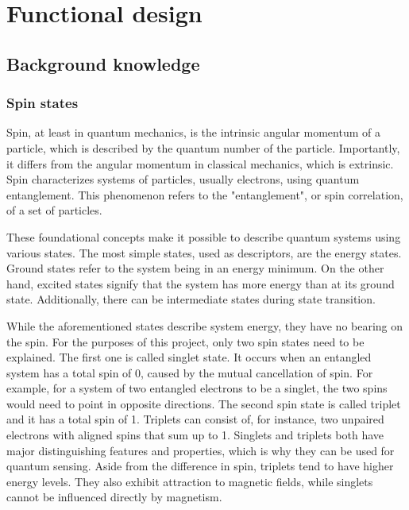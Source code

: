 \chapter{Functional design} \label{chap:func_design}
\section{Background knowledge}
\subsection{Spin states}
Spin, at least in quantum mechanics, is the intrinsic angular momentum of a particle, which is described by the quantum number of the particle. Importantly, it differs from the angular momentum in classical mechanics, which is extrinsic. Spin characterizes systems of particles, usually electrons, using quantum entanglement. This phenomenon refers to the "entanglement", or spin correlation, of a set of particles.

These foundational concepts make it possible to describe quantum systems using various states. The most simple states, used as descriptors, are the energy states. Ground states refer to the system being in an energy minimum. On the other hand, excited states signify that the system has more energy than at its ground state. Additionally, there can be intermediate states during state transition.

While the aforementioned states describe system energy, they have no bearing on the spin. For the purposes of this project, only two spin states need to be explained. The first one is called singlet state. It occurs when an entangled system has a total spin of 0, caused by the mutual cancellation of spin. For example, for a system of two entangled electrons to be a singlet, the two spins would need to point in opposite directions. The second spin state is called triplet and it has a total spin of 1. Triplets can consist of, for instance, two unpaired electrons with aligned spins that sum up to 1. Singlets and triplets both have major distinguishing features and properties, which is why they can be used for quantum sensing. Aside from the difference in spin, triplets tend to have higher energy levels. They also exhibit attraction to magnetic fields, while singlets cannot be influenced directly by magnetism.

